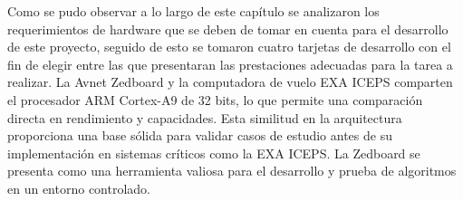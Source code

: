Como se pudo observar a lo largo de este capítulo se analizaron los requerimientos de hardware que se deben de tomar en cuenta para el desarrollo de este proyecto, seguido de esto se tomaron cuatro tarjetas de desarrollo con el fin de elegir entre las que presentaran las prestaciones adecuadas para la tarea a realizar. La Avnet Zedboard y la computadora de vuelo EXA ICEPS comparten el procesador ARM Cortex-A9 de 32 bits, lo que permite una comparación directa en rendimiento y capacidades. Esta similitud en la arquitectura proporciona una base sólida para validar casos de estudio antes de su implementación en sistemas críticos como la EXA ICEPS. La Zedboard se presenta como una herramienta valiosa para el desarrollo y prueba de algoritmos en un entorno controlado.